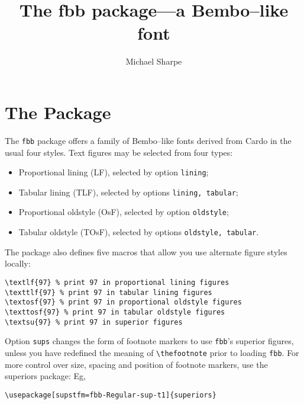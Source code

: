 \documentclass{article}
\title{The \textbf{fbb} package---a Bembo--like font}
\author{Michael Sharpe}
\date{}
\begin{document}
\maketitle
\section{The Package}
The {\tt fbb} package offers a family of Bembo--like fonts derived from Cardo in the usual four styles. Text figures may be selected from four types:
\begin{itemize}
\item
Proportional lining (LF), selected by option {\tt lining};
\item
Tabular lining (TLF), selected by options {\tt lining, tabular};
\item
Proportional oldstyle (OsF), selected by option {\tt oldstyle};
\item
Tabular oldstyle (TOsF), selected by options {\tt oldstyle, tabular}.
\end{itemize}
The package also defines five macros that allow you use alternate figure styles locally:
\begin{verbatim}
\textlf{97} % print 97 in proportional lining figures
\texttlf{97} % print 97 in tabular lining figures
\textosf{97} % print 97 in proportional oldstyle figures
\texttosf{97} % print 97 in tabular oldstyle figures
\textsu{97} % print 97 in superior figures
\end{verbatim}
Option {\tt sups} changes the form of footnote markers to use {\tt fbb}'s superior figures, unless you have redefined the meaning of \verb|\thefootnote| prior to loading {\tt fbb}. For more control over size, spacing and position of footnote markers, use the \textsf{superiors} package: Eg,
\begin{verbatim}
\usepackage[supstfm=fbb-Regular-sup-t1]{superiors}
\end{verbatim}
\end{document}
